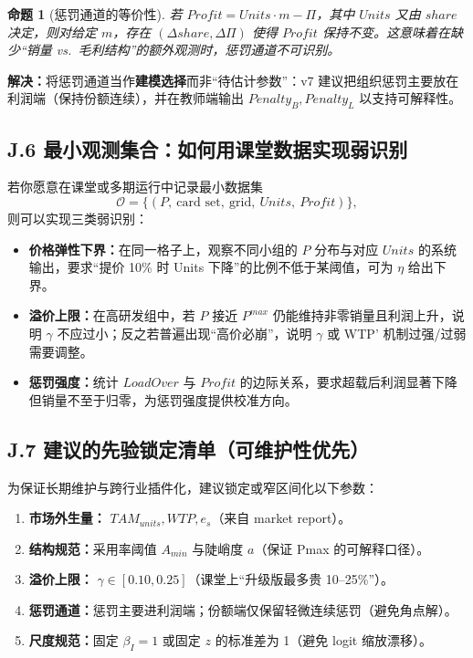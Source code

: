 \documentclass[UTF8,12pt]{ctexart}
\newtheorem{proposition}{命题}
\begin{document}
\begin{proposition}[惩罚通道的等价性]\label{prop:penalty_channel}
若 $Profit = Units\cdot m - \Pi$，其中 $Units$ 又由 $share$ 决定，则对给定 $m$，存在 $(\Delta share,\Delta \Pi)$ 使得 $Profit$ 保持不变。这意味着在缺少“销量 vs.\ 毛利结构”的额外观测时，惩罚通道不可识别。
\end{proposition}

\textbf{解决：}将惩罚通道当作\textbf{建模选择}而非“待估计参数”：v7 建议把组织惩罚主要放在利润端（保持份额连续），并在教师端输出 $Penalty_B,Penalty_L$ 以支持可解释性。

\subsection{J.6 最小观测集合：如何用课堂数据实现弱识别}
若你愿意在课堂或多期运行中记录最小数据集
\[
\mathcal{O}=\{(P,\ \text{card set},\ \text{grid},\ Units,\ Profit)\},
\]
则可以实现三类弱识别：
\begin{itemize}
  \item \textbf{价格弹性下界：}在同一格子上，观察不同小组的 $P$ 分布与对应 $Units$ 的系统输出，要求“提价 10\% 时 Units 下降”的比例不低于某阈值，可为 $\eta$ 给出下界。
  \item \textbf{溢价上限：}在高研发组中，若 $P$ 接近 $P^{max}$ 仍能维持非零销量且利润上升，说明 $\gamma$ 不应过小；反之若普遍出现“高价必崩”，说明 $\gamma$ 或 WTP' 机制过强/过弱需要调整。
  \item \textbf{惩罚强度：}统计 $LoadOver$ 与 $Profit$ 的边际关系，要求超载后利润显著下降但销量不至于归零，为惩罚强度提供校准方向。
\end{itemize}

\subsection{J.7 建议的先验锁定清单（可维护性优先）}
为保证长期维护与跨行业插件化，建议锁定或窄区间化以下参数：
\begin{enumerate}[label=(\\arabic*)]
  \item \textbf{市场外生量：} $TAM_{units},WTP,e_s$（来自 market report）。
  \item \textbf{结构规范：}采用率阈值 $A_{min}$ 与陡峭度 $a$（保证 Pmax 的可解释口径）。
  \item \textbf{溢价上限：} $\gamma\in[0.10,0.25]$（课堂上“升级版最多贵 10–25\%”）。
  \item \textbf{惩罚通道：}惩罚主要进利润端；份额端仅保留轻微连续惩罚（避免角点解）。
  \item \textbf{尺度规范：}固定 $\beta_I=1$ 或固定 $z$ 的标准差为 1（避免 logit 缩放漂移）。
\end{enumerate}
\end{document}
